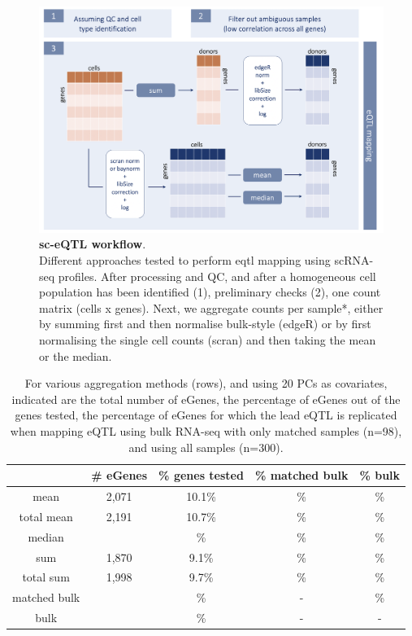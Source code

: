 \begin{figure}[h]
\centering
\includegraphics[width=15cm]{Chapter3/Fig/sc_qtl_workflow.png}
\caption[sc-eQTL workflow]{\textbf{sc-eQTL workflow}.\\
Different approaches tested to perform \gls{eqtl} mapping using scRNA-seq profiles.
After processing and QC, and after a homogeneous cell population has been identified (1), preliminary checks (2), one count matrix (cells x genes). 
Next, we aggregate counts per sample*, either by summing first and then normalise bulk-style (edgeR) or by first normalising the single cell counts (scran) and then taking the mean or the median. }
\label{fig:sc_qtl_workflow}
\end{figure}

\begin{table}[h]
    \centering
    \begin{tabular}{c|c c c c }
    & \# eGenes & \% genes tested & \% matched bulk  & \% bulk   \\
    \hline
    mean         & 2,071 & 10.1\% & \% & \% \\
    total mean   & 2,191 & 10.7\% & \% & \% \\
    median       &  & \% & \% & \% \\
    sum          & 1,870 & 9.1\% & \% & \% \\
    total sum    & 1,998 & 9.7\% & \% & \% \\
    matched bulk &  & \% & - & \% \\
    bulk         &  & \% & - & - \\
    \end{tabular}
    \caption[Aggregation method comparison]{For various aggregation methods (rows), and using 20 PCs as covariates, indicated are the total number of eGenes, the percentage of eGenes out of the genes tested, the percentage of eGenes for which the lead eQTL is replicated when mapping eQTL using bulk RNA-seq with only matched samples (n=98), and using all samples (n=300).}
    \label{tab:egenes}
\end{table}

